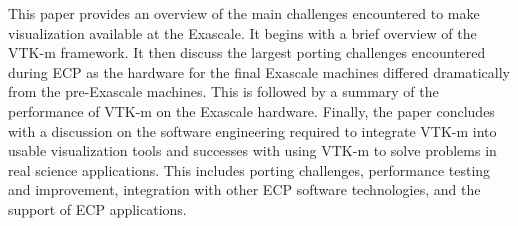 This paper provides an overview of the main challenges encountered to make visualization available at the Exascale.
It begins with a brief overview of the VTK-m framework.
It then discuss the largest porting challenges encountered during ECP as the hardware for the final Exascale machines differed dramatically from the pre-Exascale machines.
This is followed by a summary of the performance of VTK-m on the Exascale hardware.
Finally, the paper concludes with a discussion on the software engineering required to integrate VTK-m into usable visualization tools and successes with using VTK-m to solve problems in real science applications.
This includes porting challenges, performance testing and improvement, integration with other ECP software technologies, and the support of ECP applications.
